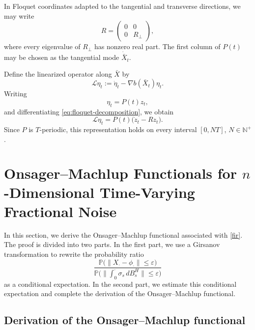 \documentclass[preprint,12pt]{elsarticle}
\theoremstyle{definition}
\theoremstyle{plain}
\begin{document}
In Floquet coordinates adapted to the tangential and transverse directions,
we may write
\begin{equation}
\label{eq:R-block}
    R=
    \begin{pmatrix}
        0 & 0\\
        0 & R_\perp
    \end{pmatrix},
\end{equation}
where every eigenvalue of $R_\perp$ has nonzero real part. The first column
of $P(t)$ may be chosen as the tangential mode $\dot{\bar X}_t$.

Define the linearized operator along $\bar X$ by
\begin{equation}
\label{eq:linearized-operator}
    \mathcal L\eta_t
    :=
    \dot\eta_t-\nabla b(\bar X_t)\eta_t.
\end{equation}
Writing
\begin{equation}
\label{eq:floquet-coordinate}
    \eta_t=P(t)z_t,
\end{equation}
and differentiating \eqref{eq:floquet-decomposition}, we obtain
\begin{equation}
\label{eq:L-floquet-coordinate}
    \mathcal L\eta_t
    =
    P(t)\bigl(\dot z_t-Rz_t\bigr).
\end{equation}
Since $P$ is $T$-periodic, this representation holds on every interval
$[0,NT]$, $N\in\mathbb N^+$.



\section{Onsager--Machlup Functionals for $n$-Dimensional Time-Varying Fractional Noise}

In this section, we derive the Onsager--Machlup functional associated with
\eqref{fir}. The proof is divided into two parts. In the first part, we use a
Girsanov transformation to rewrite the probability ratio
\begin{equation*}
\frac{
\mathbb P\bigl(\|X_\cdot-\phi_\cdot\|\leq \varepsilon\bigr)
}{
\mathbb P\bigl(
\|\int_0^\cdot \sigma_s\,dB_s^H\|\leq \varepsilon
\bigr)
}
\end{equation*}
as a conditional expectation. In the second part, we estimate this conditional
expectation and complete the derivation of the Onsager--Machlup functional.




\subsection{Derivation of the Onsager--Machlup functional}
\end{document}
